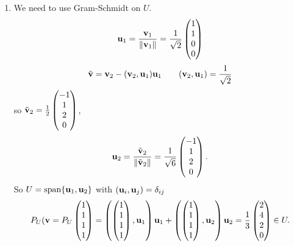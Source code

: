 \documentclass[10pt, a4paper]{article}
\begin{document}
\begin{example}
\begin{solution}
\begin{enumerate}[label = (\alph*)]
            \item We need to use Gram-Schmidt on $U$.
            \[
            \mathbf{u}_1 = \frac{\mathbf{v}_1}{\|\mathbf{v}_1\|} = \frac{1}{\sqrt{2}}\begin{pmatrix}
                1 \\ 1 \\ 0 \\ 0
            \end{pmatrix}
            \]
            \[
            \Tilde{\mathbf{v}} = \mathbf{v}_2 - (\mathbf{v}_2, \mathbf{u}_1)\mathbf{u}_1\qquad(\mathbf{v}_2, \mathbf{u}_1) = \frac{1}{\sqrt{2}}
            \]
            so $\Tilde{\mathbf{v}}_2 = \frac{1}{2}\begin{pmatrix}
                -1 \\ 1 \\ 2 \\ 0
            \end{pmatrix}$,
            \[
            \mathbf{u}_2 = \frac{\Tilde{\mathbf{v}}_2}{\|\Tilde{\mathbf{v}}_2\|} = \frac{1}{\sqrt{6}}\begin{pmatrix}
                -1 \\ 1 \\ 2 \\ 0
            \end{pmatrix}.
            \]
            So $U = \mathrm{span}\{\mathbf{u}_1, \mathbf{u}_2\}$ with $(\mathbf{u}_i, \mathbf{u}_j) = \delta_{ij}$
            \[
            P_U(\mathbf{v} = P_U\begin{pmatrix}
                1 \\ 1 \\ 1 \\ 1
            \end{pmatrix} = \left(\begin{pmatrix}
                1 \\ 1 \\ 1 \\ 1
            \end{pmatrix}, \mathbf{u}_1\right)\mathbf{u}_1 + \left(\begin{pmatrix}
                1 \\ 1 \\ 1 \\ 1
            \end{pmatrix}, \mathbf{u}_2\right)\mathbf{u}_2 = \frac{1}{3}\begin{pmatrix}
                2 \\ 4 \\ 2 \\ 0
            \end{pmatrix} \in U.
            \]
        \end{enumerate}
    \end{solution}
\end{example}
\end{document}
